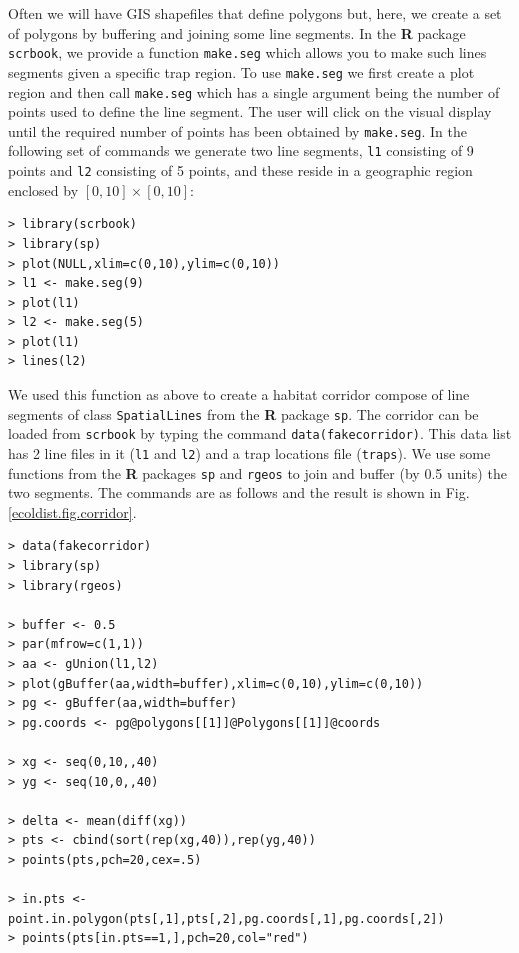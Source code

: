 Often we will have GIS shapefiles that define polygons but, here, we
 create a set of polygons by
buffering and joining some line segments.
In the {\bf R} package \mbox{\tt scrbook}, we provide
 a function \mbox{\tt make.seg} which allows you to make such
 lines segments given a
specific trap region.  To use %
\mbox{\tt make.seg} we first
create a plot region and then call \mbox{\tt make.seg} which has a
single argument being the number of points used to define the line
segment. The user will click on the visual display until the required
number of points has been obtained by \mbox{\tt make.seg}.
In the following set of commands we generate two line
segments, \mbox{\tt l1} consisting of 9 points and \mbox{\tt l2}
consisting of 5 points, and these reside in a geographic region
enclosed by $[0,10] \times [0,10]$:
{\small
\begin{verbatim}
> library(scrbook)
> library(sp)
> plot(NULL,xlim=c(0,10),ylim=c(0,10))
> l1 <- make.seg(9)
> plot(l1)
> l2 <- make.seg(5)
> plot(l1)
> lines(l2)
\end{verbatim}
}

We used this function as above to create a habitat corridor compose of
line segments of class
\mbox{\tt SpatialLines} from the {\bf R} package \mbox{\tt sp}. The
corridor can be loaded from \mbox{\tt scrbook} by typing the command
\mbox{\tt data(fakecorridor)}.
This data list has 2 line files in it (\mbox{\tt l1} and \mbox{\tt l2}) and a
trap locations file (\mbox{\tt traps}).
We use some functions from the {\bf R} packages \mbox{\tt sp} and
\mbox{\tt rgeos} to join and
buffer (by 0.5 units) the two segments. The commands are as follows
and the result is shown in Fig. \ref{ecoldist.fig.corridor}.

{\small
\begin{verbatim}
> data(fakecorridor)
> library(sp)
> library(rgeos)

> buffer <- 0.5
> par(mfrow=c(1,1))
> aa <- gUnion(l1,l2)
> plot(gBuffer(aa,width=buffer),xlim=c(0,10),ylim=c(0,10))
> pg <- gBuffer(aa,width=buffer)
> pg.coords <- pg@polygons[[1]]@Polygons[[1]]@coords

> xg <- seq(0,10,,40)
> yg <- seq(10,0,,40)

> delta <- mean(diff(xg))
> pts <- cbind(sort(rep(xg,40)),rep(yg,40))
> points(pts,pch=20,cex=.5)

> in.pts <- point.in.polygon(pts[,1],pts[,2],pg.coords[,1],pg.coords[,2])
> points(pts[in.pts==1,],pch=20,col="red")
\end{verbatim}
}

